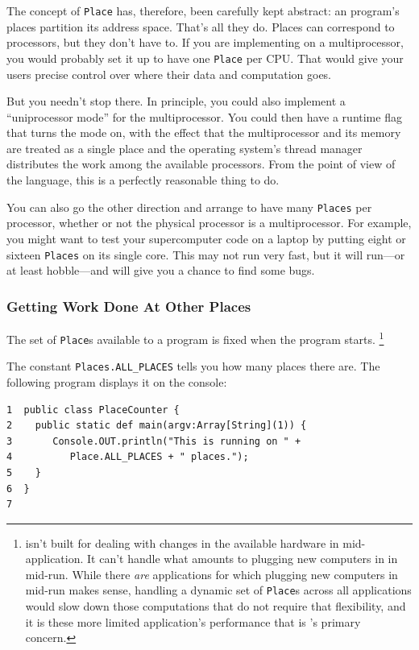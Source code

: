 The concept of {\tt Place} has, therefore, been carefully kept abstract:
an \Xten{} program's places partition its address space.  That's all they do.
Places can correspond to processors, but they don't have to. If you are
implementing \Xten{} on a multiprocessor, you would probably
set it up to have one {\tt Place}
per CPU. That would give your users precise control over where their data and
computation goes.  

But you needn't stop there.
In principle, you could also implement a ``uniprocessor mode'' for the multiprocessor.
You could then have a runtime flag that turns the mode on, with the effect that
the multiprocessor
and its memory are treated as a single place and the operating system's
thread manager distributes the work among the available processors.
From the point of view of the \Xten{} language, this is a perfectly reasonable
thing to do.  

You can also go the other direction and 
arrange to have many {\tt Places} per processor, whether or not the
physical processor is a multiprocessor.  For example,
you might want to test your supercomputer code on a laptop by putting eight or
sixteen {\tt Places} on its single core.  This may not run very fast, but it will
run---or at least hobble---and will give you a chance to find some bugs.  


\subsubsection{Getting Work Done At Other Places}

The set of {\tt Place}s available to a program is fixed when the program starts.
\footnote{
\Xten{} isn't built for dealing with changes in the available hardware in 
mid-application.  It can't handle what
amounts to plugging new computers in in mid-run.  While there {\em are}
applications for which plugging new computers in mid-run makes sense,
handling a dynamic set of {\tt Place}s across all applications would slow
down those computations that do not require that flexibility, and it is these
more limited application's performance that is \Xten{}'s primary concern.
}

The constant {\tt Places.ALL\_PLACES} tells you how many places there are.
The following program displays it on the console:
\begin{verbatim}
1  public class PlaceCounter {
2    public static def main(argv:Array[String](1)) {
3       Console.OUT.println("This is running on " + 
4          Place.ALL_PLACES + " places.");
5    }
6  }
7  
\end{verbatim}


